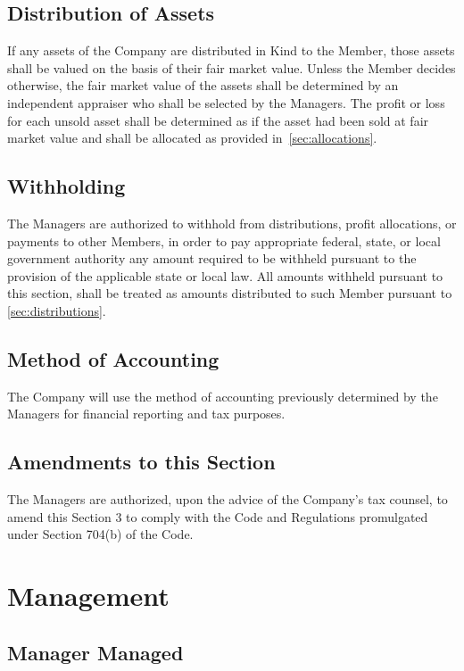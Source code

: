 \documentclass[11pt,onecolumn]{article}
\begin{document}
\subsection{Distribution of Assets}

If any assets of the Company are distributed in Kind to the Member, those assets shall be valued on the basis of their fair market value. Unless the Member decides otherwise, the fair market value of the assets shall be determined by an independent appraiser who shall be selected by the Managers. The profit or loss for each unsold asset shall be determined as if the asset had been sold at fair market value and shall be allocated as provided in~\autoref{sec:allocations}.

\subsection{Withholding}

The Managers are authorized to withhold from distributions, profit allocations, or payments to other Members, in order to pay appropriate federal, state, or local government authority any amount required to be withheld pursuant to the provision of the applicable state or local law. All amounts withheld pursuant to this section, shall be treated as amounts distributed to such Member pursuant to \autoref{sec:distributions}.

\subsection{Method of Accounting}

The Company will use the method of accounting previously determined by the Managers for financial reporting and tax purposes.

\subsection{Amendments to this Section}

The Managers are authorized, upon the advice of the Company's tax counsel, to amend this Section 3 to comply with the Code and Regulations promulgated under Section 704(b) of the Code.

\section{Management}

\subsection{Manager Managed}
\end{document}
